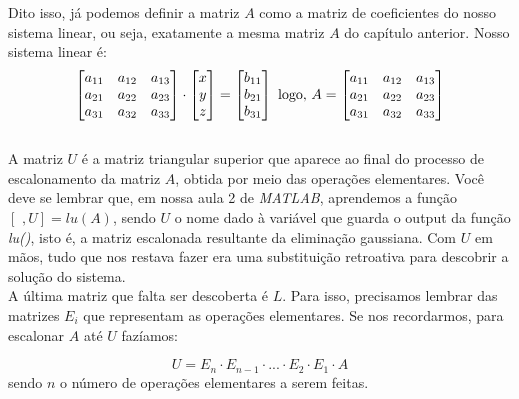 \documentclass[12pt]{article}
\begin{document}
	Dito isso, já podemos definir a matriz $A$ como a matriz de coeficientes do nosso sistema linear, ou seja, exatamente a mesma matriz $A$ do capítulo anterior. Nosso sistema linear é:\\
	\begin{equation*}
		\begin{bmatrix}
			a_{11} & a_{12} & a_{13}\\
			a_{21} & a_{22} & a_{23}\\
			a_{31} & a_{32} & a_{33}
		\end{bmatrix} \cdot
		\begin{bmatrix}
			x\\ y\\z
		\end{bmatrix}=
		\begin{bmatrix}
			b_{11} \\ b_{21} \\ b_{31}
		\end{bmatrix} \mbox{ logo, } \newline
		A=\begin{bmatrix}
			a_{11} & a_{12} & a_{13}\\
			a_{21} & a_{22} & a_{23}\\
			a_{31} & a_{32} & a_{33}
		\end{bmatrix}
	\end{equation*}\\
	
	A matriz $U$ é a matriz triangular superior que aparece ao final do processo de escalonamento da matriz $A$, obtida por meio das operações elementares. Você deve se lembrar que, em nossa aula 2 de \textit{MATLAB}, aprendemos a função $[\mbox{~},U]=lu(A)$, sendo $U$ o nome dado à variável que guarda o output da função \textit{lu()}, isto é, a matriz escalonada resultante da eliminação gaussiana. Com $U$ em mãos, tudo que nos restava fazer era uma substituição retroativa para descobrir a solução do sistema. \\
	
	A última matriz que falta ser descoberta é $L$. Para isso, precisamos lembrar das matrizes $E_i$ que representam as operações elementares. Se nos recordarmos, para escalonar $A$ até $U$ fazíamos:
	
	\begin{equation*}
		U=E_n\cdot E_{n-1} \cdot ... \cdot E_2\cdot E_1\cdot A
	\end{equation*}	
	sendo $n$ o número de operações elementares a serem feitas. \\
	
\end{document}
